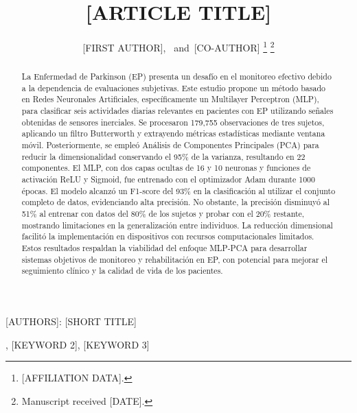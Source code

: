 \documentclass[journal]{IEEEtran}
\begin{document}
\title{[ARTICLE TITLE]}

\author{[FIRST AUTHOR],~
        and~[CO-AUTHOR]%
\thanks{[AFFILIATION DATA].}%
\thanks{Manuscript received [DATE].}}

%
{[AUTHORS]: [SHORT TITLE]}

\maketitle

\begin{abstract}
La Enfermedad de Parkinson (EP) presenta un desafío en el monitoreo efectivo debido a la dependencia de evaluaciones subjetivas. Este estudio propone un método basado en Redes Neuronales Artificiales, específicamente un Multilayer Perceptron (MLP), para clasificar seis actividades diarias relevantes en pacientes con EP utilizando señales obtenidas de sensores inerciales. Se procesaron 179,755 observaciones de tres sujetos, aplicando un filtro Butterworth y extrayendo métricas estadísticas mediante ventana móvil. Posteriormente, se empleó Análisis de Componentes Principales (PCA) para reducir la dimensionalidad conservando el 95\% de la varianza, resultando en 22 componentes. El MLP, con dos capas ocultas de 16 y 10 neuronas y funciones de activación ReLU y Sigmoid, fue entrenado con el optimizador Adam durante 1000 épocas. El modelo alcanzó un F1-score del 93\% en la clasificación al utilizar el conjunto completo de datos, evidenciando alta precisión. No obstante, la precisión disminuyó al 51\% al entrenar con datos del 80\% de los sujetos y probar con el 20\% restante, mostrando limitaciones en la generalización entre individuos. La reducción dimensional facilitó la implementación en dispositivos con recursos computacionales limitados. Estos resultados respaldan la viabilidad del enfoque MLP-PCA para desarrollar sistemas objetivos de monitoreo y rehabilitación en EP, con potencial para mejorar el seguimiento clínico y la calidad de vida de los pacientes.
\end{abstract}

\begin{IEEEkeywords}
[KEYWORD 1], [KEYWORD 2], [KEYWORD 3]
\end{IEEEkeywords}

\IEEEpeerreviewmaketitle
\end{document}
